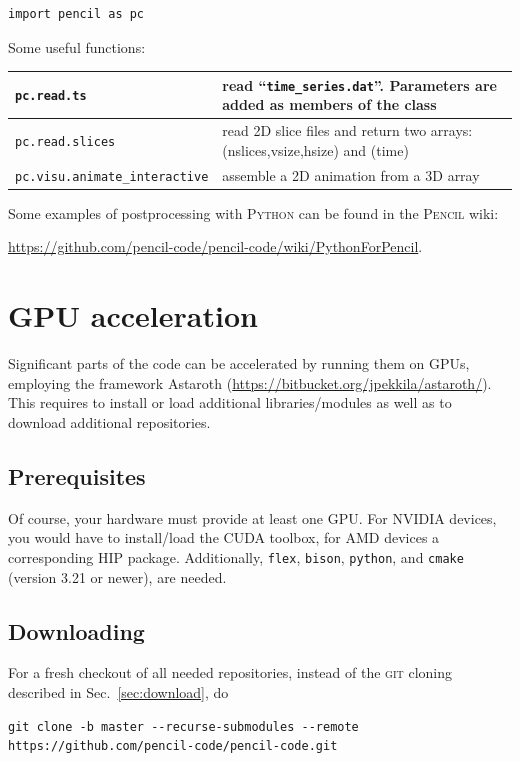 \documentclass[a4paper,12pt]{article}
\newcommand{\command}[1]{\texttt{#1}}
\newcommand{\file}[1]{``\texttt{#1}''}
\newcommand{\name}[1]{\textsc{#1}}
\newcommand{\code}[1]{\texttt{#1}}
\begin{document}
\begin{verbatim}
import pencil as pc
\end{verbatim}

Some useful functions:
\begin{center}
\begin{tabular}{|l|l|}\hline
\command{pc.read.ts} & read \file{time\_series.dat}. Parameters are added as members of the class\\\hline
\command{pc.read.slices} & read 2D slice files and return two arrays: (nslices,vsize,hsize) and (time)\\\hline
\command{pc.visu.animate\_interactive} & assemble a 2D animation from a 3D 
array\\\hline
\end{tabular}
\end{center}

Some examples of postprocessing with \name{Python} can be found in the 
\name{Pencil} wiki:


\url{https://github.com/pencil-code/pencil-code/wiki/PythonForPencil}.

% 
\section{GPU acceleration}
Significant parts of the code can be accelerated by running them on GPUs, employing the framework Astaroth (\url{https://bitbucket.org/jpekkila/astaroth/}).
This requires to install or load additional libraries/modules as well as to download additional repositories.
\subsection{Prerequisites}
Of course, your hardware must provide at least one GPU. For NVIDIA devices, you would have to install/load the CUDA toolbox, for AMD devices a corresponding  HIP package.
Additionally, \code{flex}, \code{bison}, \code{python}, and \code{cmake} (version 3.21 or newer), are needed.
\subsection{Downloading}
For a fresh checkout of all needed repositories, instead of the \name{git} cloning described in Sec.~\ref{sec:download}, do
\begin{verbatim}
git clone -b master --recurse-submodules --remote https://github.com/pencil-code/pencil-code.git 
\end{verbatim}
\end{document}
